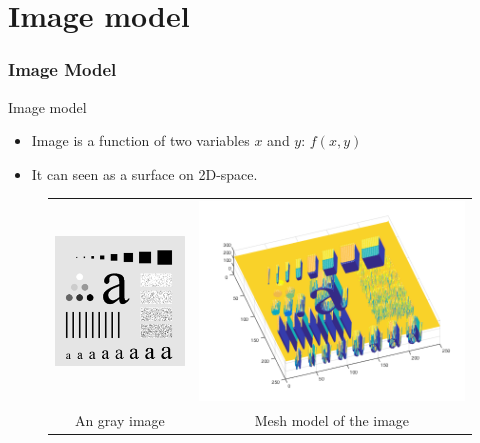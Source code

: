 \documentclass[english,11pt,table,handout]{beamer}
\begin{document}
\section{Image model}
\frame
{
	\frametitle{Image Model}
	\begin{block}{Image model}
		\begin{itemize}
			\item Image is a function of two variables $x$ and $y$: $f(x,y)$
			\item It can seen as a surface on 2D-space.
		\end{itemize}
	\end{block}
	\begin{figure}[!h]
		\begin{tabular}{cc}
			\includegraphics[scale=0.5]{char.png} &
			\includegraphics[scale=0.25]{char_mesh.png} \\
			An gray image & Mesh model of the image
		\end{tabular}
		
	\end{figure}
	
}
\end{document}

